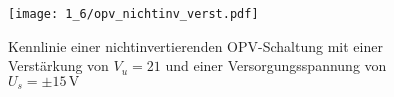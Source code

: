 \begin{figure}[H]
  \begin{center}
    \texttt{[image: 1\_6/opv\_nichtinv\_verst.pdf]}
    \end{center}
    \caption{Kennlinie einer nichtinvertierenden OPV-Schaltung mit einer
      Verstärkung von $V_u = 21$ und einer Versorgungsspannung von $U_s = \pm 15
      \, \si{\volt}$}
 \end{figure}
